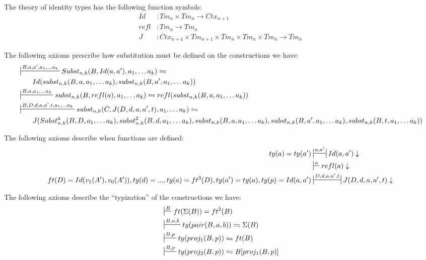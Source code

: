 \documentclass{amsart}
\theoremstyle{definition}
\theoremstyle{remark}
\numberwithin{figure}{section}
\begin{document}
The theory of identity types has the following function symbols:
\begin{align*}
Id   & : Tm_n \times Tm_n \to Ctx_{n+1} \\
refl & : Tm_n \to Tm_n \\
J    & : Ctx_{n+4} \times Tm_{n+1} \times Tm_n \times Tm_n \times Tm_n \to Tm_n
\end{align*}

The following axioms prescribe how substitution must be defined on the constructions we have:
\begin{align*}
& \sststile{}{B, a, a', a_1, \ldots a_k} Subst_{n,k}(B, Id(a,a'), a_1, \ldots a_k) \leftrightharpoons \\
& \qquad Id(subst_{n,k}(B, a, a_1, \ldots a_k), subst_{n,k}(B, a', a_1, \ldots a_k)) \\
& \sststile{}{B, a, a_1, \ldots a_k} subst_{n,k}(B, refl(a), a_1, \ldots a_k) \leftrightharpoons refl(subst_{n,k}(B, a, a_1, \ldots a_k)) \\
& \sststile{}{B, D, d, a, a', t, a_1, \ldots a_k} subst_{n,k}(C, J(D, d, a, a', t), a_1, \ldots a_k) \leftrightharpoons \\
& \qquad J(Subst^4_{n,k}(B, D, a_1, \ldots a_k), subst^2_{n,k}(B, d, a_1, \ldots a_k), subst_{n,k}(B, a, a_1, \ldots a_k), subst_{n,k}(B, a', a_1, \ldots a_k), subst_{n,k}(B, t, a_1, \ldots a_k)) \\
\end{align*}

The following axioms describe when functions are defined:
\begin{align*}
ty(a) = ty(a') & \ssststile{}{a,a'} Id(a,a') \downarrow \\
               & \sststile{}{a} refl(a) \downarrow \\
ft(D) = Id(v_1(A'), v_0(A')), ty(d) = ..., ty(a) = ft^3(D), ty(a') = ty(a), ty(p) = Id(a,a') & \ssststile{}{D,d,a,a',t} J(D,d,a,a',t) \downarrow
\end{align*}

The following axioms describe the ``typization'' of the constructions we have:
\begin{align*}
& \sststile{}{B} ft(\Sigma(B)) = ft^2(B) \\
& \sststile{}{B,a,b} ty(pair(B,a,b)) \leftrightharpoons \Sigma(B) \\
& \sststile{}{B,p} ty(proj_1(B,p)) \leftrightharpoons ft(B) \\
& \sststile{}{B,p} ty(proj_2(B,p)) \leftrightharpoons B[proj_1(B,p)]
\end{align*}
\end{document}
